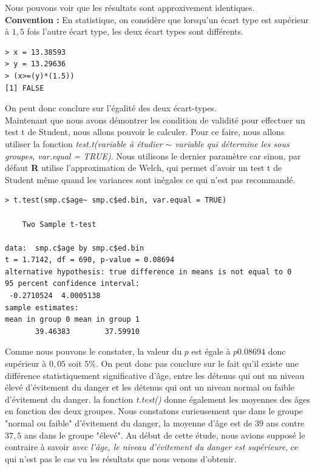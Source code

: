 Nous pouvons voir que les résultats sont approxivement identiques.\newline
\\
\textbf{Convention : } En statistique, on considère que lorsqu'un écart type est supérieur à $1,5$ fois l'autre écart type, les deux écart types sont différents.
\begin{lstlisting}[language=html]
> x = 13.38593
> y = 13.29636
> (x>=(y)*(1.5))
[1] FALSE
\end{lstlisting}
On peut donc conclure sur l'égalité des deux écart-types.\newline
\\
Maintenant que nous avons démontrer les condition de validité pour effectuer un test t de Student, nous allons pouvoir le calculer.\newline
Pour ce faire, nous allons utiliser la fonction \textit{test.t(variable à étudier $\sim$ variable qui détermine les sous groupes, var.equal = TRUE)}.\newline
Nous utilisons le dernier paramètre car sinon, par défaut \textbf{R} utilise l'approximation de Welch, qui permet d'avoir un test t de Student même quand les variances sont inégales ce qui n'est pas recommandé.
\begin{lstlisting}[language=html]
> t.test(smp.c$age~ smp.c$ed.bin, var.equal = TRUE)

	Two Sample t-test

data:  smp.c$age by smp.c$ed.bin
t = 1.7142, df = 690, p-value = 0.08694
alternative hypothesis: true difference in means is not equal to 0
95 percent confidence interval:
 -0.2710524  4.0005138
sample estimates:
mean in group 0 mean in group 1 
       39.46383        37.59910 
\end{lstlisting}
Comme nous pouvons le constater, la valeur du $p$ est égale à $p0.08694$ donc supérieur à $0,05$ soit $5\%$. On peut donc pas conclure sur le fait qu'il existe une différence statistiquement significative d'âge, entre les détenus qui ont un niveau élevé d'évitement du danger et les détenus qui ont un niveau normal ou faible d'évitement du danger.\newline
la fonction \textit{t.test()} donne également les moyennes des âges en fonction des deux groupes. Nous constatons curieusement que dans le groupe "normal ou faible" d'évitement du danger, la moyenne d'âge est de $39$ ans contre $37,5$ ans dans le groupe "élevé". Au début de cette étude, nous avions supposé le contraire à savoir \textit{avec l'âge, le niveau d'évitement du danger est supérieure}, ce qui n'est pas le cas vu les résultats que nous venons d'obtenir.\newline
